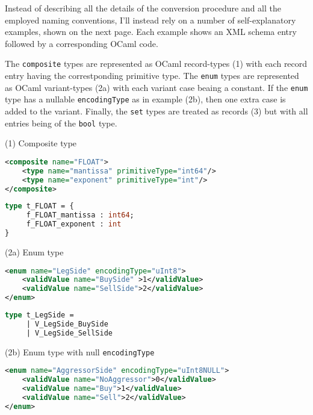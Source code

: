 \documentclass[twoside,a4paper]{refart}
\begin{document}
Instead of describing all the details of the conversion procedure and all the
employed naming conventions, I'll instead rely on a number of self-explanatory
examples, shown on the next page. Each example shows an XML schema entry
followed by a corresponding OCaml code.

The \texttt{composite} types are represented as OCaml record-types (1) with
each record entry having the correstponding primitive type. The \texttt{enum}
types are represented as OCaml variant-types (2a) with each variant case beaing
a constant.  If the \texttt{enum} type has a nullable \texttt{encodingType} as
in example (2b), then one extra case is added to the variant.  Finally, the
\texttt{set} types are treated as records (3) but with all entries being of the
\texttt{bool} type.

\newpage

\begin{center} (1) Composite type \end{center}
\begin{lstlisting}[language=XML]
<composite name="FLOAT">
    <type name="mantissa" primitiveType="int64"/>
    <type name="exponent" primitiveType="int"/>
</composite>
\end{lstlisting}
\begin{lstlisting}[language=ML]
type t_FLOAT = {
     f_FLOAT_mantissa : int64;
     f_FLOAT_exponent : int
}
\end{lstlisting}

\begin{center} (2a) Enum type \end{center}
\begin{lstlisting}[language=XML]
<enum name="LegSide" encodingType="uInt8">
    <validValue name="BuySide" >1</validValue>
    <validValue name="SellSide">2</validValue>
</enum>
\end{lstlisting}

\begin{lstlisting}[language=ML]
type t_LegSide =
     | V_LegSide_BuySide
     | V_LegSide_SellSide
\end{lstlisting}


\begin{center} (2b) Enum type with null \texttt{encodingType} \end{center}
\begin{lstlisting}[language=XML]
<enum name="AggressorSide" encodingType="uInt8NULL">
    <validValue name="NoAggressor">0</validValue>
    <validValue name="Buy">1</validValue>
    <validValue name="Sell">2</validValue>
</enum>
\end{lstlisting}
\end{document}
